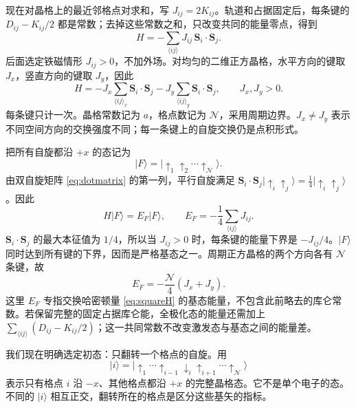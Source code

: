 \documentclass[UTF8,11pt,a4paper,fontset=fandol]{ctexart}
\newcommand{\ket}[1]{\lvert #1\rangle}
\begin{document}
现在对晶格上的最近邻格点对求和，写 $J_{ij}=2K_{ij}$。轨道和占据固定后，每条键的 $D_{ij}-K_{ij}/2$ 都是常数；去掉这些常数之和，只改变共同的能量零点，得到
\begin{equation}
\boxed{
H=-\sum_{\langle ij\rangle}J_{ij}\,\mathbf S_i\cdot\mathbf S_j.
}
\label{eq:latticeH}
\end{equation}
后面选定铁磁情形 $J_{ij}>0$，不加外场。对均匀的二维正方晶格，水平方向的键取 $J_x$，竖直方向的键取 $J_y$，因此
\begin{equation}
H=-J_x\sum_{\langle ij\rangle_x}\mathbf S_i\cdot\mathbf S_j
-J_y\sum_{\langle ij\rangle_y}\mathbf S_i\cdot\mathbf S_j,
\qquad J_x,J_y>0.
\label{eq:squareH}
\end{equation}
每条键只计一次。晶格常数记为 $a$，格点数记为 $\mathcal N$，采用周期边界。$J_x\neq J_y$ 表示不同空间方向的交换强度不同；每一条键上的自旋交换仍是点积形式。

把所有自旋都沿 $+x$ 的态记为
\begin{equation}
\ket{F}=\ket{\uparrow_1\uparrow_2\cdots\uparrow_{\mathcal N}}.
\end{equation}
由双自旋矩阵 \eqref{eq:dotmatrix} 的第一列，平行自旋满足
$\mathbf S_i\cdot\mathbf S_j\ket{\uparrow_i\uparrow_j}
=\tfrac14\ket{\uparrow_i\uparrow_j}$。因此
\begin{equation}
H\ket{F}=E_F\ket{F},
\qquad
E_F=-\frac14\sum_{\langle ij\rangle}J_{ij}.
\label{eq:EFgeneral}
\end{equation}
$\mathbf S_i\cdot\mathbf S_j$ 的最大本征值为 $1/4$，所以当 $J_{ij}>0$ 时，每条键的能量下界是 $-J_{ij}/4$。$\ket{F}$ 同时达到所有键的下界，因而是严格基态之一。周期正方晶格的两个方向各有 $\mathcal N$ 条键，故
\begin{equation}
\boxed{E_F=-\frac{\mathcal N}{4}(J_x+J_y).}
\label{eq:EF}
\end{equation}
这里 $E_F$ 专指交换哈密顿量 \eqref{eq:squareH} 的基态能量，不包含此前略去的库仑常数。若保留完整的固定占据库仑能，全极化态的能量还需加上 $\sum_{\langle ij\rangle}(D_{ij}-K_{ij}/2)$；这一共同常数不改变激发态与基态之间的能量差。

我们现在明确选定初态：只翻转一个格点的自旋。用
\begin{equation}
\ket{i}=
\ket{\uparrow_1\cdots\uparrow_{i-1}\downarrow_i
\uparrow_{i+1}\cdots\uparrow_{\mathcal N}}
\label{eq:oneflip}
\end{equation}
表示只有格点 $i$ 沿 $-x$、其他格点都沿 $+x$ 的完整晶格态。它不是单个电子的态。不同的 $\ket{i}$ 相互正交，翻转所在的格点是区分这些基矢的指标。
\end{document}
